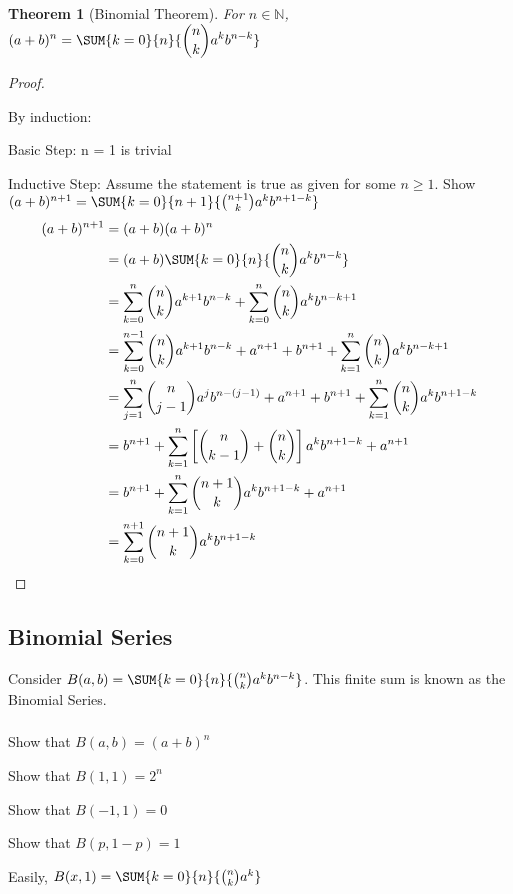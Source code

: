 \documentclass[10pt,]{book}
\theoremstyle{plain}
\newtheorem{theorem}{Theorem}[section]
\theoremstyle{definition}
\theoremstyle{definition}
\numberwithin{equation}{section}
\begin{document}
\subsection[]{}\label{subsection-3}
\begin{theorem}[Binomial Theorem]\label{theorem-Binomial}
For \( n \in \mathbb{N} \),  
				\(\displaystyle {(a+b)^n = \SUM {k=0} {n} {\binom{n}{k} a^k b^{n-k}}}\)\end{theorem}
\begin{proof}\hypertarget{proof-3}{}
By induction:%
\par
Basic Step: n = 1 is trivial%
\par
Inductive Step:  Assume the statement is true as given for some \(n \ge 1\).  
					Show \((a+b)^{n+1} = \SUM {k=0} {n+1} {\binom{n+1}{k} a^k b^{n+1-k}}\)%
\begin{align*}
(a+b)^{n+1} & = (a+b)(a+b)^n\\
 & = (a+b)\SUM {k=0} {n} {\binom{n}{k} a^k b^{n-k}}\\
 & = \sum_{k=0}^n \binom{n}{k} a^{k+1} b^{n-k} + \sum_{k=0}^n \binom{n}{k} a^k b^{n-k+1}\\
 & = \sum_{k=0}^{n-1} \binom{n}{k} a^{k+1} b^{n-k} + a^{n+1} + b^{n+1} + \sum_{k=1}^n \binom{n}{k} a^k b^{n-k+1}\\
 & = \sum_{j=1}^n \binom{n}{j-1} a^j b^{n-(j-1)} + a^{n+1} + b^{n+1} + \sum_{k=1}^n \binom{n}{k} a^k b^{n+1-k}\\
 & = b^{n+1} + \sum_{k=1}^n \left [ \binom{n}{k-1} + \binom{n}{k} \right ] a^k b^{n+1-k} + a^{n+1}\\
 & = b^{n+1} + \sum_{k=1}^n \binom{n+1}{k} a^k b^{n+1-k} + a^{n+1}\\
 & = \sum_{k=0}^{n+1} \binom{n+1 }{k} a^k b^{n+1-k}
\end{align*}\end{proof}
\typeout{************************************************}
\typeout{************************************************}
\subsection[Binomial Series]{Binomial Series}\label{subsection-4}
Consider \(B(a,b) = \SUM {k=0} {n} {\binom{n}{k} a^k b^{n-k}}\).  
		This finite sum is known as the Binomial Series.%
\typeout{************************************************}
\typeout{************************************************}
\subsubsection[]{}\label{subsection-5}
Show that \(B(a,b) = (a+b)^n\)%
\par
Show that \(B(1,1) = 2^n\)%
\par
Show that \(B(-1,1) = 0\)%
\par
Show that \(B(p,1-p) = 1\)%
\par
Easily, \(B(x,1) = \SUM {k=0} {n} {\binom{n}{k} a^k}\)%
\typeout{************************************************}
\typeout{************************************************}
\end{document}
